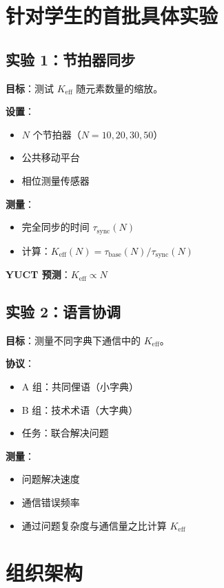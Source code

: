 \documentclass[12pt,a4paper]{article}
\begin{document}
	\section{针对学生的首批具体实验}
	
	\subsection{实验 1：节拍器同步}
	
	\textbf{目标}：测试 $K_{\mathrm{eff}}$ 随元素数量的缩放。
	
	\textbf{设置}：
	\begin{itemize}
		\item $N$ 个节拍器（$N = 10, 20, 30, 50$）
		\item 公共移动平台
		\item 相位测量传感器
	\end{itemize}
	
	\textbf{测量}：
	\begin{itemize}
		\item 完全同步的时间 $\tau_{\mathrm{sync}}(N)$
		\item 计算：$K_{\mathrm{eff}}(N) = \tau_{\mathrm{base}}(N)/\tau_{\mathrm{sync}}(N)$
	\end{itemize}
	
	\textbf{YUCT 预测}：$K_{\mathrm{eff}} \propto N$
	
	\subsection{实验 2：语言协调}
	
	\textbf{目标}：测量不同字典下通信中的 $K_{\mathrm{eff}}$。
	
	\textbf{协议}：
	\begin{itemize}
		\item A 组：共同俚语（小字典）
		\item B 组：技术术语（大字典）
		\item 任务：联合解决问题
	\end{itemize}
	
	\textbf{测量}：
	\begin{itemize}
		\item 问题解决速度
		\item 通信错误频率
		\item 通过问题复杂度与通信量之比计算 $K_{\mathrm{eff}}$
	\end{itemize}
	
	\section{组织架构}
	
\end{document}
